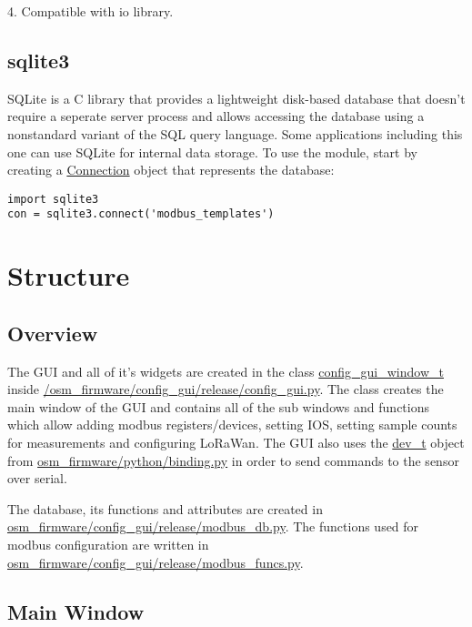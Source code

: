 \documentclass[a4paper,12pt, notitlepage]{article}
\begin{document}
4. Compatible with io library.

\subsection{sqlite3}
\label{libsql3}

SQLite is a C library that provides a lightweight disk-based database that doesn't require a seperate server process and allows accessing the database using a nonstandard variant of the SQL query language. Some applications including this one can use SQLite for internal data storage. To use the module, start by creating a \url{Connection} object that represents the database:

\begin{lstlisting}
import sqlite3
con = sqlite3.connect('modbus_templates')

\end{lstlisting}


\newpage
\section{Structure}
\label{sec: structgui}

\subsection{Overview}
\label{ssec: guiOverview}

The GUI and all of it's widgets are created in the class \url{config_gui_window_t} inside \url{/osm_firmware/config_gui/release/config_gui.py}. The class creates the main window of the GUI and contains all of the sub windows and functions which allow adding modbus registers/devices, setting IOS, setting sample counts for measurements and configuring LoRaWan. The GUI also uses the \url{dev_t} object from \url{osm_firmware/python/binding.py} in order to send commands to the sensor over serial.

The database, its functions and attributes are created in \url{osm_firmware/config_gui/release/modbus_db.py}. The functions used for modbus configuration are written in \url{osm_firmware/config_gui/release/modbus_funcs.py}.


\subsection{Main Window}
\label{subsec: mainw}
\end{document}
